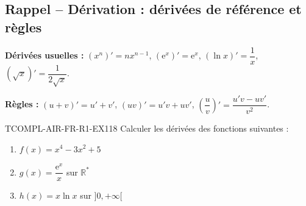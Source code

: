 

\subsection*{Rappel -- Dérivation : dérivées de référence et règles}

\textbf{Dérivées usuelles :} $(x^n)' = n x^{n-1}$, $(\mathrm{e}^x)' = \mathrm{e}^x$, $(\ln x)' = \dfrac{1}{x}$, $(\sqrt{x})' = \dfrac{1}{2\sqrt{x}}$.

\textbf{Règles :} $(u+v)' = u' + v'$, $(uv)' = u'v + uv'$, $\left(\dfrac{u}{v}\right)' = \dfrac{u'v - uv'}{v^2}$.

\begin{exercice}{TCOMPL-AIR-FR-R1-EX1}{1}{8}
Calculer les dérivées des fonctions suivantes :
\begin{enumerate}
  \item $f(x) = x^4 - 3x^2 + 5$
  \item $g(x) = \dfrac{\mathrm{e}^x}{x}$ sur $\mathbb{R}^*$
  \item $h(x) = x \ln x$ sur $]0, +\infty[$
\end{enumerate}
\end{exercice}

